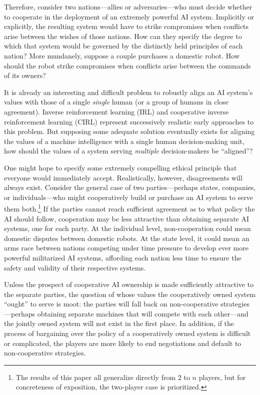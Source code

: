 \documentclass{article}  %
\begin{document}
Therefore, consider two nations---allies or adversaries---who must decide whether to cooperate in the deployment of an extremely powerful AI system.  Implicitly or explicitly, the resulting system would have to strike compromises when conflicts arise between the wishes of those nations.  How can they specify the degree to which that system would be governed by the distinctly held principles of each nation?  More mundanely, suppose a couple purchases a domestic robot.  How should the robot strike compromises when conflicts arise between the commands of its owners?

It is already an interesting and difficult problem to robustly align an AI system's values with those of a single \emph{single} human (or a group of humans in close agreement).  Inverse reinforcement learning (IRL) \citep{russell1998learning} \citep{ng2000algorithms} \citep{abbeel2004apprenticeship} and cooperative inverse reinforcement learning (CIRL) \citep{hadfield2016cooperative} represent successively realistic early approaches to this problem.  But supposing some adequate solution eventually exists for aligning the values of a machine intelligence with a single human decision-making unit, how should the values of a system serving \emph{multiple} decision-makers be ``aligned''?

One might hope to specify some extremely compelling ethical principle that everyone would immediately accept.  Realistically, however, disagreements will always exist.  Consider the general case of two parties---perhaps states, companies, or individuals---who might cooperatively build or purchase an AI system to serve them both.\footnote{The results of this paper all generalize directly from $2$ to $n$ players, but for concreteness of exposition, the two-player case is prioritized.}   If the parties cannot reach sufficient agreement as to what policy the AI should follow, cooperation may be less attractive than obtaining separate AI systems, one for each party.  At the individual level, non-cooperation could mean domestic disputes between domestic robots.  At the state level, it could mean an arms race between nations competing under time pressure to develop ever more powerful militarized AI systems, affording each nation less time to ensure the safety and validity of their respective systems.

Unless the prospect of cooperative AI ownership is made sufficiently attractive to the separate parties, the question of whose values the cooperatively owned system ``ought'' to serve is moot:  the parties will fall back on non-cooperative strategies---perhaps obtaining separate machines that will compete with each other---and the jointly owned system will not exist in the first place.   In addition, if the process of bargaining over the policy of a cooperatively owned system is difficult or complicated, the players are more likely to end negotiations and default to non-cooperative strategies. 
\end{document}
